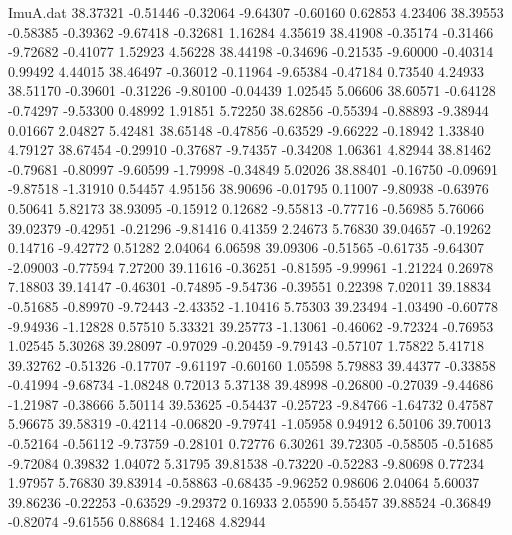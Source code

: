 \begin{filecontents}{ImuA.dat}
  38.37321   -0.51446   -0.32064   -9.64307   -0.60160    0.62853    4.23406
  38.39553   -0.58385   -0.39362   -9.67418   -0.32681    1.16284    4.35619
  38.41908   -0.35174   -0.31466   -9.72682   -0.41077    1.52923    4.56228
  38.44198   -0.34696   -0.21535   -9.60000   -0.40314    0.99492    4.44015
  38.46497   -0.36012   -0.11964   -9.65384   -0.47184    0.73540    4.24933
  38.51170   -0.39601   -0.31226   -9.80100   -0.04439    1.02545    5.06606
  38.60571   -0.64128   -0.74297   -9.53300    0.48992    1.91851    5.72250
  38.62856   -0.55394   -0.88893   -9.38944    0.01667    2.04827    5.42481
  38.65148   -0.47856   -0.63529   -9.66222   -0.18942    1.33840    4.79127
  38.67454   -0.29910   -0.37687   -9.74357   -0.34208    1.06361    4.82944
  38.81462   -0.79681   -0.80997   -9.60599   -1.79998   -0.34849    5.02026
  38.88401   -0.16750   -0.09691   -9.87518   -1.31910    0.54457    4.95156
  38.90696   -0.01795    0.11007   -9.80938   -0.63976    0.50641    5.82173
  38.93095   -0.15912    0.12682   -9.55813   -0.77716   -0.56985    5.76066
  39.02379   -0.42951   -0.21296   -9.81416    0.41359    2.24673    5.76830
  39.04657   -0.19262    0.14716   -9.42772    0.51282    2.04064    6.06598
  39.09306   -0.51565   -0.61735   -9.64307   -2.09003   -0.77594    7.27200
  39.11616   -0.36251   -0.81595   -9.99961   -1.21224    0.26978    7.18803
  39.14147   -0.46301   -0.74895   -9.54736   -0.39551    0.22398    7.02011
  39.18834   -0.51685   -0.89970   -9.72443   -2.43352   -1.10416    5.75303
  39.23494   -1.03490   -0.60778   -9.94936   -1.12828    0.57510    5.33321
  39.25773   -1.13061   -0.46062   -9.72324   -0.76953    1.02545    5.30268
  39.28097   -0.97029   -0.20459   -9.79143   -0.57107    1.75822    5.41718
  39.32762   -0.51326   -0.17707   -9.61197   -0.60160    1.05598    5.79883
  39.44377   -0.33858   -0.41994   -9.68734   -1.08248    0.72013    5.37138
  39.48998   -0.26800   -0.27039   -9.44686   -1.21987   -0.38666    5.50114
  39.53625   -0.54437   -0.25723   -9.84766   -1.64732    0.47587    5.96675
  39.58319   -0.42114   -0.06820   -9.79741   -1.05958    0.94912    6.50106
  39.70013   -0.52164   -0.56112   -9.73759   -0.28101    0.72776    6.30261
  39.72305   -0.58505   -0.51685   -9.72084    0.39832    1.04072    5.31795
  39.81538   -0.73220   -0.52283   -9.80698    0.77234    1.97957    5.76830
  39.83914   -0.58863   -0.68435   -9.96252    0.98606    2.04064    5.60037
  39.86236   -0.22253   -0.63529   -9.29372    0.16933    2.05590    5.55457
  39.88524   -0.36849   -0.82074   -9.61556    0.88684    1.12468    4.82944

\end{filecontents}
